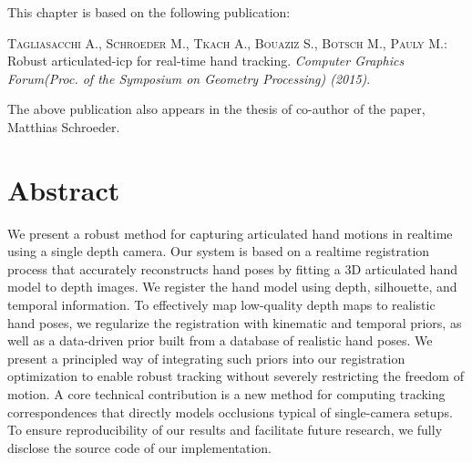 
This chapter is based on the following publication:

\begin{adjustwidth}{2.5em}{0pt}
\textsc{Tagliasacchi A., Schroeder M., Tkach A., Bouaziz S., Botsch M., Pauly
M.}: Robust articulated-icp for real-time hand tracking. \textit{Computer Graphics
Forum(Proc. of the Symposium on Geometry Processing) (2015)}.
\end{adjustwidth}

The above publication also appears in the thesis of  co-author of the paper, Matthias Schroeder.

\section*{Abstract}
We present a robust method for capturing articulated hand motions in realtime using a single depth camera. Our system is based on a realtime registration process that accurately reconstructs hand poses by fitting a 3D articulated hand model to depth images.
We register the hand model using depth, silhouette, and temporal information. To effectively map low-quality depth maps to realistic hand poses, we regularize the registration with kinematic and temporal priors, as well as a data-driven prior built from a database of realistic hand poses.
We present a principled way of integrating such priors into our registration optimization to enable robust tracking without severely restricting the freedom of motion.
A core technical contribution is a new method for computing tracking correspondences that directly models occlusions typical of single-camera setups.
To ensure reproducibility of our results and facilitate future research, we fully disclose the source code of our implementation.





